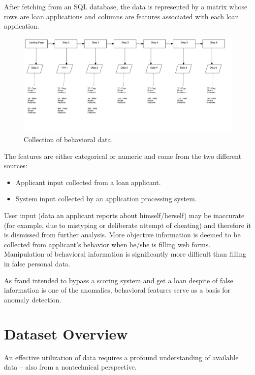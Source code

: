 After fetching from an SQL database, the data is represented by a matrix whose rows are loan applications and columns are features associated with each loan application. 

\begin{figure}[h!]
    \centering
    \includegraphics[scale=0.20]{Graphics/FlowchartDiagram1.png}
    \caption{Collection of behavioral data.}
    \label{fig:behav-data}
\end{figure}

The features are either categorical or numeric and come from the two different sources:
\begin{itemize}
    \item Applicant input collected from a loan applicant.
    \item System input collected by an application processing system.
\end{itemize}

User input (data an applicant reports about himself/herself) may be inaccurate (for example, due to mistyping or deliberate attempt of cheating) and therefore it is dismissed from further analysis.
More objective information is deemed to be collected from  applicant's behavior when he/she is filling web forms. Manipulation of behavioral information is significantly more difficult than filling in false personal data.

As fraud intended to bypass a scoring system and get a loan despite of false information is one of the anomalies, behavioral features serve as a basis for anomaly detection. 

\section{Dataset Overview}\label{Ch:2:Overview}
An effective utilization of data requires a profound understanding of available data -- also from a nontechnical perspective.

